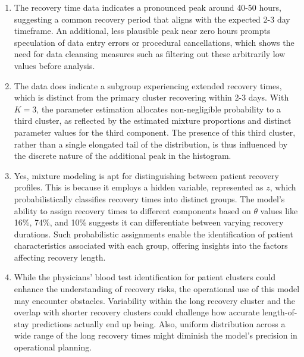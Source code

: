 \documentclass[submit]{harvardml}
\begin{document}
\begin{enumerate}
  \item The recovery time data indicates a pronounced peak around 40-50 hours, suggesting a common recovery period that aligns with the expected 2-3 day timeframe. An additional, less plausible peak near zero hours prompts speculation of data entry errors or procedural cancellations, which shows the need for data cleansing measures such as filtering out these arbitrarily low values before analysis.
  \item The data does indicate a subgroup experiencing extended recovery times, which is distinct from the primary cluster recovering within 2-3 days. With $K=3$, the parameter estimation allocates non-negligible probability to a third cluster, as reflected by the estimated mixture proportions and distinct parameter values for the third component. The presence of this third cluster, rather than a single elongated tail of the distribution, is thus influenced by the discrete nature of the additional peak in the histogram.
  \item Yes, mixture modeling is apt for distinguishing between patient recovery profiles. This is because it employs a hidden variable, represented as \( z \), which probabilistically classifies recovery times into distinct groups. The model's ability to assign recovery times to different components based on \( \theta \) values like 16\%, 74\%, and 10\% suggests it can differentiate between varying recovery durations. Such probabilistic assignments enable the identification of patient characteristics associated with each group, offering insights into the factors affecting recovery length.
  \item While the physicians' blood test identification for patient clusters could enhance the understanding of recovery risks, the operational use of this model may encounter obstacles. Variability within the long recovery cluster and the overlap with shorter recovery clusters could challenge how accurate length-of-stay predictions actually end up being. Also, uniform distribution across a wide range of the long recovery times might diminish the model's precision in operational planning.

\end{enumerate}


\newpage
  
\end{document}

